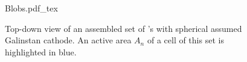 \begin{figure}[H]\centering
{Blobs.pdf_tex}
\caption{Top-down view of an assembled set of \BHSC's with spherical assumed Galinstan cathode. An active area $A_n$ of a cell of this set is highlighted in blue. }
\label{fig:blobs}
\end{figure}

%
%
